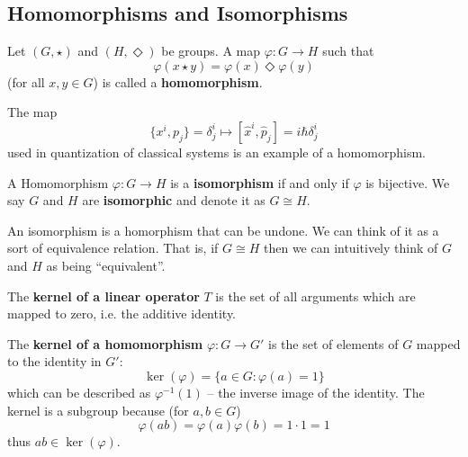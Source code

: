 \subsection{Homomorphisms and Isomorphisms}

\begin{defn}
Let $(G,\star)$ and $(H,\Diamond)$ be groups. A map $\varphi:G\to H$ such that
\begin{equation}
\varphi(x\star y) = \varphi(x)\Diamond\varphi(y)
\end{equation}
(for all $x,y\in G$) is called a \textbf{homomorphism}.
\end{defn}

\begin{ex}
The map
\begin{equation}
\{x^i,p_j\}=\delta^{i}_{j} \mapsto [\hat{x}^i,\hat{p}_j] = i\hbar\delta^{i}_{j}
\end{equation}
used in quantization of classical systems is an example of a homomorphism.
\end{ex}

\begin{defn}
A Homomorphism $\varphi:G\to H$ is a \textbf{isomorphism} if and only if $\varphi$ is bijective.
We say $G$ and $H$ are \textbf{isomorphic} and denote it as $G\cong H$.
\end{defn}

\begin{rmk}
An isomorphism is a homorphism that can be undone. We can think of it as a sort
of equivalence relation. That is, if $G\cong H$ then we can intuitively think
of $G$ and $H$ as being ``equivalent''.
\end{rmk}

\begin{defn}
The \textbf{kernel of a linear operator} $T$ is the set of all arguments which
are mapped to zero, i.e. the additive identity.
\end{defn}

\begin{defn}
The \textbf{kernel of a homomorphism} $\varphi: G\to G'$ is the set of elements
of $G$ mapped to the identity in $G'$:
\begin{equation}
\ker(\varphi) = \{ a\in G : \varphi(a) = 1 \}
\end{equation}
which can be described as $\varphi^{-1}(1)$ -- the inverse image of the identity.
The kernel is a subgroup because (for $a,b\in G$)
\begin{equation}
\varphi(ab)=\varphi(a)\varphi(b)=1\cdot 1 = 1
\end{equation}
thus $ab\in\ker(\varphi)$.
\end{defn}

